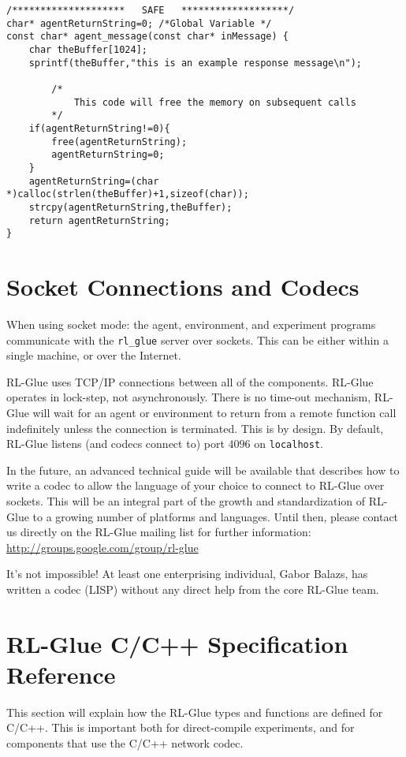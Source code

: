 \documentclass[11pt]{article}
\begin{document}
\begin{verbatim}
/********************   SAFE   *******************/
char* agentReturnString=0; /*Global Variable */	
const char* agent_message(const char* inMessage) {
    char theBuffer[1024];
    sprintf(theBuffer,"this is an example response message\n");

        /*
            This code will free the memory on subsequent calls
        */
    if(agentReturnString!=0){
        free(agentReturnString);
        agentReturnString=0;
    }
    agentReturnString=(char *)calloc(strlen(theBuffer)+1,sizeof(char));
    strcpy(agentReturnString,theBuffer);
    return agentReturnString;
}
\end{verbatim}



\section{Socket Connections and Codecs}
When using socket mode: the agent, environment, and experiment programs communicate with the \texttt{rl\_glue} server over sockets.  This can be either within a single machine, or over the Internet.

RL-Glue uses TCP/IP connections between all of the components.  RL-Glue operates in lock-step, not asynchronously.  There is no time-out mechanism, RL-Glue will wait for an agent or environment to return from a remote function call indefinitely unless the connection is terminated.  This is by design.   By default, RL-Glue listens (and codecs connect to) port $4096$ on \texttt{localhost}.

In the future, an advanced technical guide will be available that describes how to write a codec to allow the language of your choice to connect to RL-Glue over sockets.  This will be an integral part of the growth and standardization of RL-Glue to a growing number of platforms and languages.  Until then, please contact us directly on the RL-Glue mailing list for further information:\\
\url{http://groups.google.com/group/rl-glue}

It's not impossible!  At least one enterprising individual, Gabor Balazs, has written a codec (LISP) without any direct help from the core RL-Glue team.  

\section{RL-Glue C/C++ Specification Reference}
This section will explain how the RL-Glue types and functions are defined for C/C++.  This is important both for direct-compile experiments, and for components that
 use the C/C++ network codec.
\end{document}
